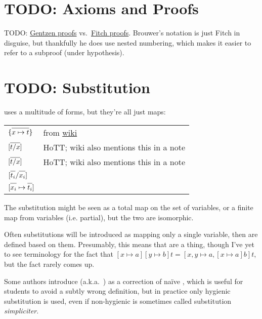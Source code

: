 \documentclass[11pt]{article} %
\theoremstyle{definition}
\theoremstyle{remark}
\begin{document}
\section{TODO: Axioms and Proofs}

TODO: \href{https://en.wikipedia.org/wiki/Sequent_calculus}{Gentzen proofs} vs.\ \href{https://en.wikipedia.org/wiki/Fitch_notation}{Fitch proofs}. Brouwer's notation is just Fitch in disguise, but thankfully he does use nested numbering, which makes it easier to refer to a subproof (under hypothesis).


\section{TODO: Substitution}


 uses a multitude of forms, but they're all just maps:
\begin{center}
\renewcommand{\arraystretch}{1.2}
\begin{tabular}{lp{10cm}}
$\{\overline{\mathstrut x \mapsto t}\}$ &
    from \href{https://en.wikipedia.org/wiki/Substitution_(logic)}{wiki} \\
$[\overline{\mathstrut t/x}]$ & HoTT; wiki also mentions this in a note \\
$[\overline{\mathstrut t/x}]$ & HoTT; wiki also mentions this in a note \\
$[\overline{\mathstrut t_i} / \overline{\mathstrut x_i}]$ &  \\
$[\overline{\mathstrut x_i}\mapsto\overline{\mathstrut t_i}]$ &  \\
\end{tabular}
\end{center}
The substitution might be seen as a total map on the set of variables, or a finite map from variables (i.e. partial), but the two are isomorphic.

Often substitutions will be introduced as mapping only a single variable, then  are defined based on them.
Presumably, this means that  are a thing, though I've yet to see terminology for the fact that $[x \mapsto a][y \mapsto b]t = [x, y \mapsto a, [x \mapsto a]b]t$, but the fact rarely comes up.

Some authors introduce  (a.k.a.\ ) as a correction of na\"ive , which is useful for students to avoid a subtly wrong definition, but in practice only hygienic substitution is used, even if non-hygienic is sometimes called substitution \textit{simpliciter}.
\end{document}
